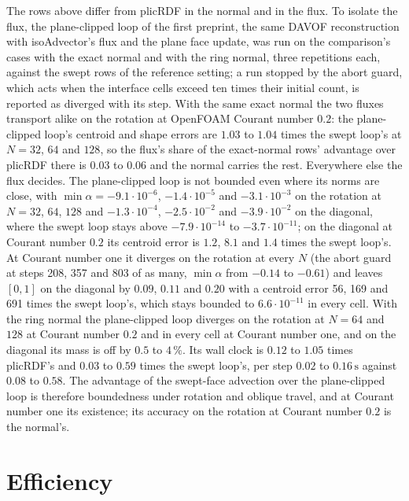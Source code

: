 \documentclass[preprint,12pt]{elsarticle}
\begin{document}
The rows above differ from plicRDF in the normal and in the flux. To isolate the flux, the plane-clipped loop of the first preprint, the same DAVOF reconstruction with isoAdvector's flux and the plane face update, was run on the comparison's cases with the exact normal and with the ring normal, three repetitions each, against the swept rows of the reference setting; a run stopped by the abort guard, which acts when the interface cells exceed ten times their initial count, is reported as diverged with its step. With the same exact normal the two fluxes transport alike on the rotation at OpenFOAM Courant number $0.2$: the plane-clipped loop's centroid and shape errors are $1.03$ to $1.04$ times the swept loop's at $N = 32$, $64$ and $128$, so the flux's share of the exact-normal rows' advantage over plicRDF there is $0.03$ to $0.06$ and the normal carries the rest. Everywhere else the flux decides. The plane-clipped loop is not bounded even where its norms are close, with $\min\alpha = -9.1\cdot10^{-6}$, $-1.4\cdot10^{-5}$ and $-3.1\cdot10^{-3}$ on the rotation at $N = 32$, $64$, $128$ and $-1.3\cdot10^{-4}$, $-2.5\cdot10^{-2}$ and $-3.9\cdot10^{-2}$ on the diagonal, where the swept loop stays above $-7.9\cdot10^{-14}$ to $-3.7\cdot10^{-11}$; on the diagonal at Courant number $0.2$ its centroid error is $1.2$, $8.1$ and $1.4$ times the swept loop's. At Courant number one it diverges on the rotation at every $N$ (the abort guard at steps 208, 357 and 803 of as many, $\min\alpha$ from $-0.14$ to $-0.61$) and leaves $[0, 1]$ on the diagonal by $0.09$, $0.11$ and $0.20$ with a centroid error 56, 169 and 691 times the swept loop's, which stays bounded to $6.6\cdot10^{-11}$ in every cell. With the ring normal the plane-clipped loop diverges on the rotation at $N = 64$ and $128$ at Courant number $0.2$ and in every cell at Courant number one, and on the diagonal its mass is off by $0.5$ to $4\,\%$. Its wall clock is $0.12$ to $1.05$ times plicRDF's and $0.03$ to $0.59$ times the swept loop's, per step $0.02$ to $0.16\,\mathrm{s}$ against $0.08$ to $0.58$. The advantage of the swept-face advection over the plane-clipped loop is therefore boundedness under rotation and oblique travel, and at Courant number one its existence; its accuracy on the rotation at Courant number $0.2$ is the normal's.

\section{Efficiency}
\label{sec:efficiency}
\end{document}
